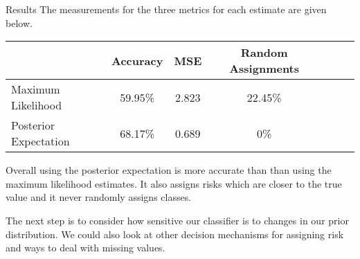 \documentclass{beamer}
\begin{document}
\begin{frame}
\begin{columns}
\begin{column}{0.30\paperwidth}
		\begin{block}{Results}
			The measurements for the three metrics for each estimate are given below.
			\begin{center}
				\begin{tabular}{ l|c c c c c c }
					                      & Accuracy & MSE   & Random Assignments\\
					\hline
					Maximum Likelihood    & 59.95\%  & 2.823 & 22.45\% \\
					Posterior Expectation & 68.17\%  & 0.689 & 0\%
				\end{tabular}
			\end{center}
			Overall using the posterior expectation is more accurate than than using the maximum likelihood estimates. It also assigns risks which are closer to the true value and it never randomly assigns classes.\vspace{0.5em}

			The next step is to consider how sensitive our classifier is to changes in our prior distribution. We could also look at other decision mechanisms for assigning risk and ways to deal with missing values.
		\end{block}

	\end{column}
\end{columns}
\end{frame}
\end{document}
